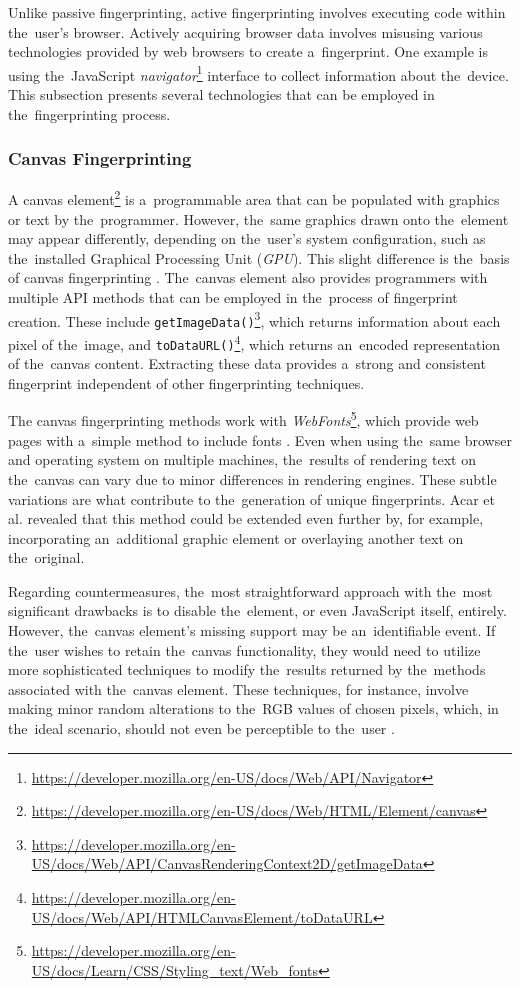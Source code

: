Unlike passive fingerprinting, active fingerprinting involves executing code within the~user's browser. Actively acquiring browser data involves misusing various technologies provided by web browsers to create a~fingerprint. One example is using the~JavaScript \textit{navigator}\footnote{\url{https://developer.mozilla.org/en-US/docs/Web/API/Navigator}} interface to collect information about the~device. This subsection presents several technologies that can be employed in the~fingerprinting process.

\subsubsection{Canvas Fingerprinting}
A canvas element\footnote{\url{https://developer.mozilla.org/en-US/docs/Web/HTML/Element/canvas}} is a~programmable area that can be populated with graphics or text by the~programmer. However, the~same graphics drawn onto the~element may appear differently, depending on the~user's system configuration, such as the~installed Graphical Processing Unit (\emph{GPU}). This slight difference is the~basis of canvas fingerprinting \cite{canvas}. The~canvas element also provides programmers with multiple API methods that can be employed in the~process of fingerprint creation. These include \texttt{getImageData()}\footnote{\url{https://developer.mozilla.org/en-US/docs/Web/API/CanvasRenderingContext2D/getImageData}}, which returns information about each pixel of the~image, and \texttt{toDataURL()}\footnote{\url{https://developer.mozilla.org/en-US/docs/Web/API/HTMLCanvasElement/toDataURL}}, which returns an~encoded representation of the~canvas content. Extracting these data provides a~strong and consistent fingerprint independent of other fingerprinting techniques.

The canvas fingerprinting methods work with \emph{WebFonts}\footnote{\url{https://developer.mozilla.org/en-US/docs/Learn/CSS/Styling\_text/Web\_fonts}}, which provide web pages with a~simple method to include fonts \cite{canvas}. Even when using the~same browser and operating system on multiple machines, the~results of rendering text on the~canvas can vary due to minor differences in rendering engines. These subtle variations are what contribute to the~generation of unique fingerprints. Acar et al. \cite{web-never-forgets} revealed that this method could be extended even further by, for example, incorporating an~additional graphic element or overlaying another text on the~original. 

Regarding countermeasures, the~most straightforward approach with the~most significant drawbacks is to disable the~element, or even JavaScript itself, entirely. However, the~canvas element's missing support may be an~identifiable event. If the~user wishes to retain the~canvas functionality, they would need to utilize more sophisticated techniques to modify the~results returned by the~methods associated with the~canvas element. These techniques, for instance, involve making minor random alterations to the~RGB values of chosen pixels, which, in the~ideal scenario, should not even be perceptible to the~user \cite{vut-farbling}.

